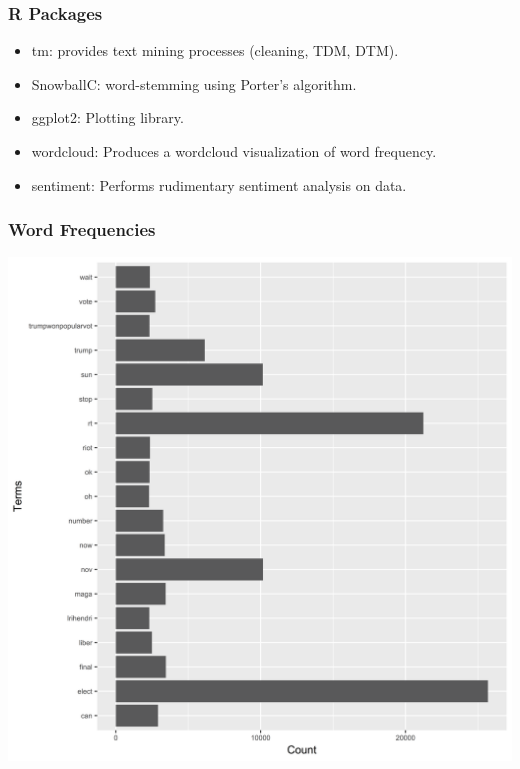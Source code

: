 \documentclass{beamer}
\begin{document}
\begin{frame}
	\frametitle{R Packages}
	\begin{itemize}
    \item tm: provides text mining processes (cleaning, TDM, DTM).
    \newline
    \item SnowballC: word-stemming using Porter's algorithm.
    \newline
    \item ggplot2: Plotting library.
    \newline
    \item wordcloud: Produces a wordcloud visualization of word frequency.
    \newline
    \item sentiment: Performs rudimentary sentiment analysis on data.
    \newline
	\end{itemize}
\end{frame}

\begin{frame}
  \frametitle{Word Frequencies}
  \center
  \includegraphics[height = 0.9\textheight]{freqplot}
\end{frame}
\end{document}
